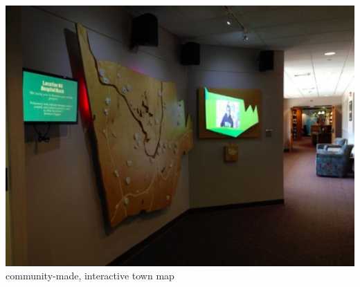 \documentclass[a4paper,9pt]{article}
\begin{document}
    \begin{minipage}{0.48\linewidth}

        \centering
        \includegraphics[width=.9\linewidth]{Images/MapProject-e1473975181395.jpg}
        \\{community-made, interactive town map \footnotemark}
        \label{protohoriz}
\end{minipage}
\label{lightmus}
\newpage
\end{document}
